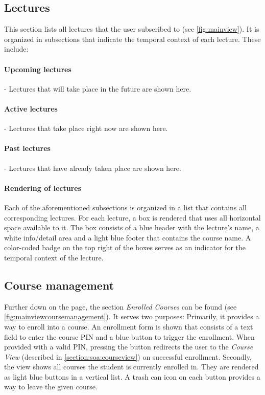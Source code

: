 \subsection{Lectures}
\label{section:soa:mainview:lectures}
This section lists all lectures that the user subscribed to (see \autoref{fig:mainview}). It is organized in subsections that indicate the temporal context of each lecture. These include:

\paragraph{Upcoming lectures} - Lectures that will take place in the future are shown here.
\paragraph{Active lectures} - Lectures that take place right now are shown here.
\paragraph{Past lectures} - Lectures that have already taken place are shown here.

\paragraph{Rendering of lectures}

Each of the aforementioned subsections is organized in a list that contains all corresponding lectures. For each lecture, a box is rendered that uses all horizontal space available to it. The box consists of a blue header with the lecture's name, a white info/detail area and a light blue footer that contains the course name.
A color-coded badge on the top right of the boxes serves as an indicator for the temporal context of the lecture.



\subsection{Course management}

Further down on the page, the section \emph{Enrolled Courses} can be found (see \autoref{fig:mainviewcoursemanagement}). It serves two purposes: Primarily, it provides a way to enroll into a course. An enrollment form is shown that consists of a text field to enter the course PIN and a blue button to trigger the enrollment. When provided with a valid PIN, pressing the button redirects the user to the \emph{Course View} (described in \autoref{section:soa:courseview})  on successful enrollment.
Secondly, the view shows all courses the student is currently enrolled in. They are rendered as light blue buttons in a vertical list. A trash can icon on each button provides a way to leave the given course.


